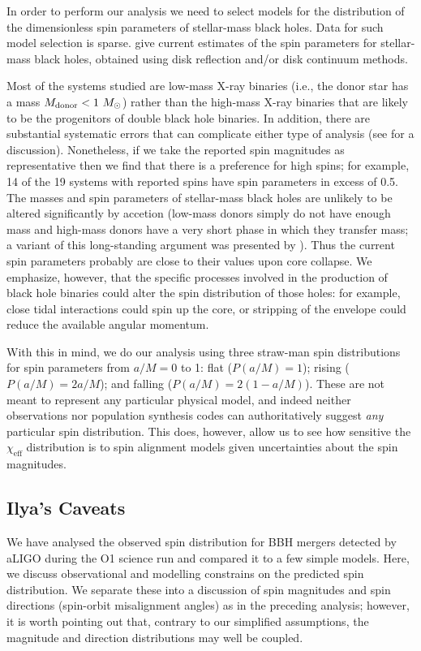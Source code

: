 \documentclass[modern]{aastex61}
\newcommand{\chieff}{\chi_\mathrm{eff}}
\begin{document}
In order to perform our analysis we need to select models for the 
distribution of the dimensionless spin parameters of stellar-mass black 
holes.  Data for such model selection is sparse.  \citet{2015PhR...548....1M} 
give current estimates of the spin parameters for stellar-mass black holes, 
obtained using disk reflection and/or disk continuum methods.  

Most of the systems studied are low-mass X-ray binaries (i.e., the donor star 
has a mass $M_{\rm donor}<1~M_\odot$) rather than the high-mass X-ray binaries 
that are likely to be the progenitors of double black hole binaries.  In 
addition, there are substantial systematic errors that can complicate either 
type of analysis (see \citealt{2015PhR...548....1M} for a discussion). Nonetheless, 
if we take the reported spin magnitudes as representative then we find that there 
is a preference for high spins; for example, 14 of the 19 systems with reported 
spins have spin parameters in excess of 0.5.  The masses and spin parameters of 
stellar-mass black holes are unlikely to be altered significantly by accetion 
(low-mass donors simply do not have enough mass and high-mass donors have a very 
short phase in which they transfer mass; a variant of this long-standing argument 
was presented by \citealt{1999MNRAS.305..654K}).  Thus the current spin parameters 
probably are close to their values upon core collapse.  We emphasize, however, 
that the specific processes involved in the production of black hole binaries 
could alter the spin distribution of those holes: for example, close tidal 
interactions could spin up the core, or stripping of the envelope could reduce the 
available angular momentum.

With this in mind, we do our analysis using three straw-man spin distributions for 
spin parameters from $a/M=0$ to 1: flat ($P(a/M)=1$); rising ($P(a/M)=2a/M$); and 
falling ($P(a/M)=2(1-a/M)$).  These are not meant to represent any particular 
physical model, and indeed neither observations nor population synthesis codes 
can authoritatively suggest {\it any} particular spin distribution.  This does, 
however, allow us to see how sensitive the $\chieff$ distribution is to spin alignment 
models given uncertainties about the spin magnitudes.

\subsection{Ilya's Caveats}

We have analysed the observed spin distribution for BBH mergers detected by aLIGO during the O1 science run and compared it to a few simple models.  Here, we discuss observational and modelling constrains on the predicted spin distribution.  We separate these into a discussion of spin magnitudes and spin directions (spin-orbit misalignment angles) as in the preceding analysis; however, it is worth pointing out that, contrary to our simplified assumptions, the magnitude and direction distributions may well be coupled.
\end{document}
